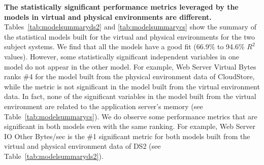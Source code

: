 \documentclass[smallextended]{svjour3}       %
\begin{document}
\noindent \textbf{The statistically significant performance metrics leveraged by the models in virtual and physical environments are different.} Tables~\ref{tab:modelsummaryds2} and \ref{tab:modelsummarycs} show the summary of the statistical models built for the virtual and physical environments for the two subject systems. We find that all the models have a good fit (66.9\% to 94.6\% $R^2$ values). However, some statistically significant independent variables in one model do not appear in the other model. For example, Web Server Virtual Bytes ranks \#4 for the model built from the physical environment data of CloudStore, while the metric is not significant in the model built from the virtual environment data. In fact, none of the significant variables in the model built from the virtual environment are related to the application server's memory (see Table~\ref{tab:modelsummarycs}). We do observe some performance metrics that are significant in both models even with the same ranking. For example, Web Server IO Other Bytes/sec is the \#1 significant metric for both models built from the virtual and physical environment data of DS2 (see Table~\ref{tab:modelsummaryds2}). 
\end{document}
